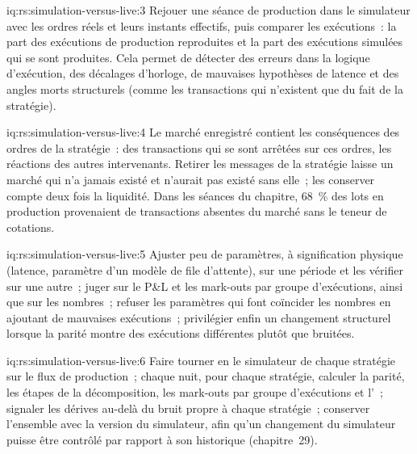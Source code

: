\begin{solution}{iq:rs:simulation-versus-live:3}
Rejouer une séance de production dans le simulateur avec les ordres réels et leurs instants effectifs, puis comparer les exécutions~: la part des exécutions de production reproduites et la part des exécutions simulées
qui se sont produites. Cela permet de détecter des erreurs dans la logique d'exécution, des décalages d'horloge, de mauvaises hypothèses de latence et des angles morts structurels (comme les transactions qui n'existent que du fait de la
stratégie).
\end{solution}

\begin{solution}{iq:rs:simulation-versus-live:4}
Le marché enregistré contient les conséquences des ordres de la stratégie~: des transactions qui se sont arrêtées sur ces ordres, les réactions des autres intervenants. Retirer les messages de la stratégie laisse un marché qui n'a jamais existé
et n'aurait pas existé sans elle~; les conserver compte deux fois la liquidité. Dans les séances du chapitre, 68~\% des lots en production provenaient de transactions absentes du
marché sans le teneur de cotations.
\end{solution}

\begin{solution}{iq:rs:simulation-versus-live:5}
Ajuster peu de paramètres, à signification physique (latence, paramètre d'un modèle de file d'attente), sur une période et les vérifier sur une autre~; juger sur le P\&L et les mark-outs par groupe d'exécutions, ainsi que sur les nombres~;
refuser les paramètres qui font coïncider les nombres en ajoutant de mauvaises exécutions~; privilégier enfin un changement structurel lorsque la parité montre des exécutions différentes plutôt que bruitées.
\end{solution}

\begin{solution}{iq:rs:simulation-versus-live:6}
Faire tourner en  le simulateur de chaque stratégie sur le flux de production~; chaque nuit, pour chaque stratégie, calculer la parité, les étapes de la décomposition, les mark-outs par groupe d'exécutions et l'~; signaler les dérives au-delà du bruit propre à chaque stratégie~; conserver l'ensemble avec la version du simulateur, afin qu'un changement du simulateur puisse être contrôlé par rapport à son
historique (chapitre~29).
\end{solution}
